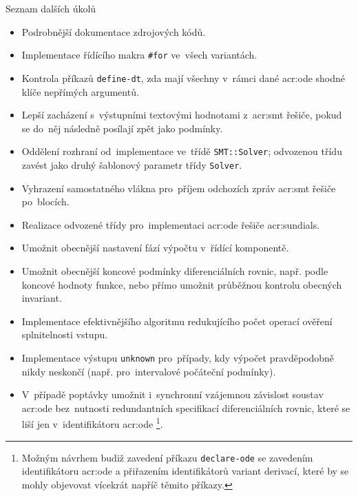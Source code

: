 \documentclass[thesis=M,czech]{FITthesis}[2012/06/26]
\newcommand{\acrlabel}[1]{acr:#1}
\newcommand{\acr}[1]{\acrshort{\acrlabel{#1}}}
\newcommand{\id}[1]{\texttt{#1}}
\begin{document}

\begin{section}{Seznam dalších úkolů}\label{s:impl:todo}
\begin{itemize}
\item Podrobnější dokumentace zdrojových kódů.
\item Implementace řídícího makra \id{\#for} ve~všech variantách.
\item Kontrola příkazů \id{define\--dt}, zda mají všechny
   v~rámci dané \acr{ode} shodné klíče nepřímých argumentů.
\item Lepší zacházení s~výstupními textovými hodnotami z~\acr{smt}
   řešiče, pokud se do~něj následně posílají zpět jako podmínky.
\item Oddělení rozhraní od~implementace ve~třídě \id{SMT::\-Solver};
   odvozenou třídu zavést jako druhý šablonový parametr třídy \id{Solver}.
\item Vyhrazení samostatného vlákna pro~příjem
   odchozích zpráv \acr{smt} řešiče po~blocích.
\item Realizace odvozené třídy pro~implementaci
   \acr{ode} řešiče \acr{sundials}.
\item Umožnit obecnější nastavení fází výpočtu v~řídící komponentě.
\item Umožnit obecnější koncové podmínky diferenciálních rovnic,
   např. podle koncové hodnoty funkce,
   nebo přímo umožnit průběžnou kontrolu obecných invariant.
\item Implementace efektivnějšího algoritmu
   redukujícího počet operací ověření splnitelnosti vstupu.
\item Implementace výstupu \id{unknown} pro~případy,
   kdy výpočet pravděpodobně nikdy neskončí
   (např. pro~intervalové počáteční podmínky).
\item V~případě poptávky umožnit i~synchronní
   vzájemnou závislost soustav \acr{ode}
   bez~nutnosti redundantních
   specifikací diferenciálních rovnic,
   které se liší jen v~identifikátoru \acr{ode}%
   \footnote{Možným návrhem budiž zavedení příkazu
   \id{declare\--ode} se zavedením identifikátoru \acr{ode}
   a přiřazením identifikátorů variant derivací,
   které by se mohly objevovat vícekrát napříč těmito příkazy.}.
\end{itemize}
\end{section} %


\end{document}
